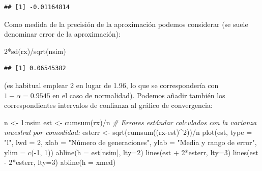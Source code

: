 \documentclass[
]{book}
\newenvironment{Shaded}{\begin{snugshade}}{\end{snugshade}}
\newcommand{\AttributeTok}[1]{\textcolor[rgb]{0.77,0.63,0.00}{#1}}
\newcommand{\CommentTok}[1]{\textcolor[rgb]{0.56,0.35,0.01}{\textit{#1}}}
\newcommand{\DecValTok}[1]{\textcolor[rgb]{0.00,0.00,0.81}{#1}}
\newcommand{\FunctionTok}[1]{\textcolor[rgb]{0.00,0.00,0.00}{#1}}
\newcommand{\NormalTok}[1]{#1}
\newcommand{\OtherTok}[1]{\textcolor[rgb]{0.56,0.35,0.01}{#1}}
\newcommand{\SpecialCharTok}[1]{\textcolor[rgb]{0.00,0.00,0.00}{#1}}
\newcommand{\StringTok}[1]{\textcolor[rgb]{0.31,0.60,0.02}{#1}}
\theoremstyle{break}
\theoremstyle{definition}
\theoremstyle{definition}
\theoremstyle{definition}
\theoremstyle{definition}
\theoremstyle{remark}
\begin{document}
\begin{verbatim}
## [1] -0.01164814
\end{verbatim}

Como medida de la precisión de la aproximación podemos considerar (se suele denominar error de la aproximación):

\begin{Shaded}
\begin{Highlighting}[]
\DecValTok{2}\SpecialCharTok{*}\FunctionTok{sd}\NormalTok{(rx)}\SpecialCharTok{/}\FunctionTok{sqrt}\NormalTok{(nsim)}
\end{Highlighting}
\end{Shaded}

\begin{verbatim}
## [1] 0.06545382
\end{verbatim}

(es habitual emplear 2 en lugar de 1.96,
lo que se correspondería con \(1 - \alpha = 0.9545\) en el caso de normalidad).
Podemos añadir también los correspondientes intervalos de confianza al gráfico de convergencia:

\begin{Shaded}
\begin{Highlighting}[]
\NormalTok{n }\OtherTok{\textless{}{-}} \DecValTok{1}\SpecialCharTok{:}\NormalTok{nsim}
\NormalTok{est }\OtherTok{\textless{}{-}} \FunctionTok{cumsum}\NormalTok{(rx)}\SpecialCharTok{/}\NormalTok{n}
\CommentTok{\# Errores estándar calculados con la varianza muestral por comodidad:}
\NormalTok{esterr }\OtherTok{\textless{}{-}} \FunctionTok{sqrt}\NormalTok{(}\FunctionTok{cumsum}\NormalTok{((rx}\SpecialCharTok{{-}}\NormalTok{est)}\SpecialCharTok{\^{}}\DecValTok{2}\NormalTok{))}\SpecialCharTok{/}\NormalTok{n  }
\FunctionTok{plot}\NormalTok{(est, }\AttributeTok{type =} \StringTok{"l"}\NormalTok{, }\AttributeTok{lwd =} \DecValTok{2}\NormalTok{, }\AttributeTok{xlab =} \StringTok{"Número de generaciones"}\NormalTok{, }
     \AttributeTok{ylab =} \StringTok{"Media y rango de error"}\NormalTok{, }\AttributeTok{ylim =} \FunctionTok{c}\NormalTok{(}\SpecialCharTok{{-}}\DecValTok{1}\NormalTok{, }\DecValTok{1}\NormalTok{))}
\FunctionTok{abline}\NormalTok{(}\AttributeTok{h =}\NormalTok{ est[nsim], }\AttributeTok{lty=}\DecValTok{2}\NormalTok{)}
\FunctionTok{lines}\NormalTok{(est }\SpecialCharTok{+} \DecValTok{2}\SpecialCharTok{*}\NormalTok{esterr, }\AttributeTok{lty=}\DecValTok{3}\NormalTok{)}
\FunctionTok{lines}\NormalTok{(est }\SpecialCharTok{{-}} \DecValTok{2}\SpecialCharTok{*}\NormalTok{esterr, }\AttributeTok{lty=}\DecValTok{3}\NormalTok{)}
\FunctionTok{abline}\NormalTok{(}\AttributeTok{h =}\NormalTok{ xmed)}
\end{Highlighting}
\end{Shaded}
\end{document}
